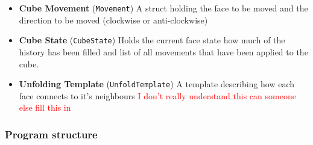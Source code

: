 \documentclass[8pt]{article}
\begin{document}
\begin{itemize}

    \item \textbf{Cube Movement} (\texttt{Movement}) A struct holding the face to 
    be moved and the direction to be moved (clockwise or anti-clockwise)
    
    \item \textbf{Cube State} (\texttt{CubeState}) Holds the current face state 
    how much of the history has been filled and list of all movements that have 
    been applied to the cube.

    \item \textbf{Unfolding Template} (\texttt{UnfoldTemplate}) A template describing 
    how each face connects to it's neighbours  \textcolor{red}{I don't really 
    understand this can someone else fill this in}
    
\end{itemize}

\subsubsection{Program structure}
\end{document}
